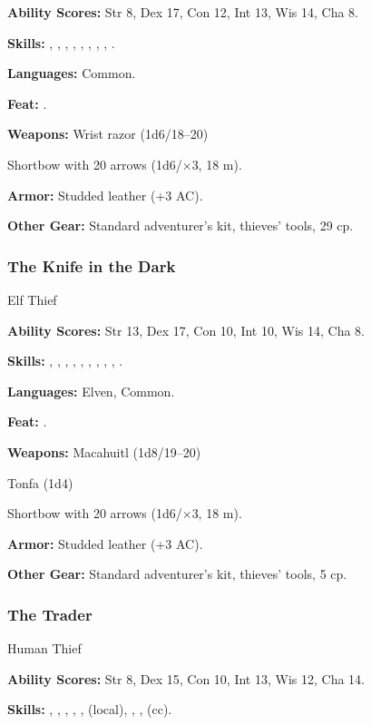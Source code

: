 \textbf{Ability Scores:} Str 8, Dex 17, Con 12, Int 13, Wis 14, Cha 8.

\textbf{Skills:} , , , , , , , , .

\textbf{Languages:} Common.

\textbf{Feat:} .

\textbf{Weapons:} Wrist razor (1d6/18--20)

Shortbow with 20 arrows (1d6/$\times$3, 18 m).

\textbf{Armor:} Studded leather (+3 AC).

\textbf{Other Gear:} Standard adventurer's kit, thieves' tools, 29 cp.

\subsubsection{The Knife in the Dark}
Elf Thief

\textbf{Ability Scores:} Str 13, Dex 17, Con 10, Int 10, Wis 14, Cha 8.

\textbf{Skills:} , , , , , , , , , .

\textbf{Languages:} Elven, Common.

\textbf{Feat:} .

\textbf{Weapons:} Macahuitl (1d8/19--20)

Tonfa (1d4)

Shortbow with 20 arrows (1d6/$\times$3, 18 m).

\textbf{Armor:} Studded leather (+3 AC).

\textbf{Other Gear:} Standard adventurer's kit, thieves' tools, 5 cp.

\subsubsection{The Trader}
Human Thief

\textbf{Ability Scores:} Str 8, Dex 15, Con 10, Int 13, Wis 12, Cha 14.

\textbf{Skills:} , , , , ,  (local), , ,  (cc).

